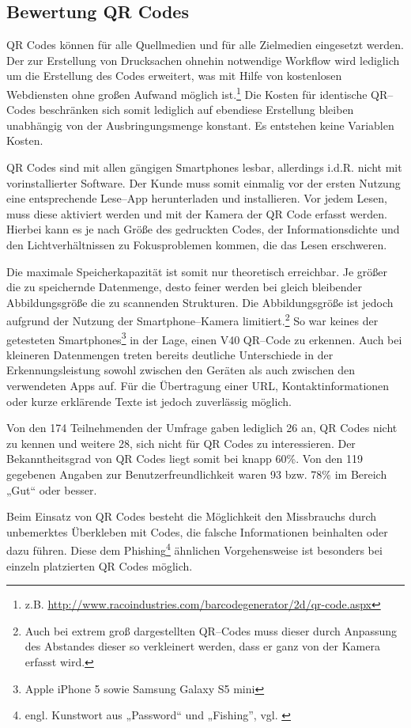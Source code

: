 \subsection{Bewertung QR Codes} %
\label{sub:bewertung_qr_codes}
QR Codes können für alle Quellmedien und für alle Zielmedien eingesetzt werden. Der zur Erstellung von Drucksachen ohnehin notwendige Workflow wird lediglich um die Erstellung des Codes erweitert, was mit Hilfe von kostenlosen Webdiensten ohne großen Aufwand möglich ist.\footnote{z.B. \url{http://www.racoindustries.com/barcodegenerator/2d/qr-code.aspx}} Die Kosten für identische QR–Codes beschränken sich somit lediglich auf ebendiese Erstellung bleiben unabhängig von der Ausbringungsmenge konstant. Es entstehen keine Variablen Kosten.

QR Codes sind mit allen gängigen Smartphones lesbar, allerdings i.d.R. nicht mit vorinstallierter Software. Der Kunde muss somit einmalig vor der ersten Nutzung eine entsprechende Lese–App herunterladen und installieren. Vor jedem Lesen, muss diese aktiviert werden und mit der Kamera der QR Code erfasst werden. Hierbei kann es je nach Größe des gedruckten Codes, der Informationsdichte und den Lichtverhältnissen zu Fokusproblemen kommen, die das Lesen erschweren.   

Die maximale Speicherkapazität ist somit nur theoretisch erreichbar. Je größer die zu speichernde Datenmenge, desto feiner werden bei gleich bleibender Abbildungsgröße die zu scannenden Strukturen. Die Abbildungsgröße ist jedoch aufgrund der Nutzung der Smartphone–Kamera limitiert.\footnote{Auch bei extrem groß dargestellten QR–Codes muss dieser durch Anpassung des Abstandes dieser so verkleinert werden, dass er ganz von der Kamera erfasst wird.} So war keines der getesteten Smartphones\footnote{Apple iPhone 5 sowie Samsung Galaxy S5 mini} in der Lage, einen V40 QR–Code zu erkennen. Auch bei kleineren Datenmengen treten bereits deutliche Unterschiede in der Erkennungsleistung sowohl zwischen den Geräten als auch zwischen den verwendeten Apps auf. Für die Übertragung einer \ac{URL}, Kontaktinformationen oder kurze erklärende Texte ist jedoch zuverlässig möglich.

Von den 174 Teilnehmenden der Umfrage gaben lediglich 26 an, QR Codes nicht zu kennen und weitere 28, sich nicht für QR Codes zu interessieren. Der Bekanntheitsgrad von QR Codes liegt somit bei knapp 60\%. Von den 119 gegebenen Angaben zur Benutzerfreundlichkeit waren 93 bzw. 78\% im Bereich „Gut“ oder besser. 

Beim Einsatz von QR Codes besteht die Möglichkeit den Missbrauchs durch unbemerktes Überkleben mit Codes, die falsche Informationen beinhalten oder dazu führen. Diese dem Phishing\footnote{engl. Kunstwort aus „Password“ und „Fishing”, vgl. \cite{bsi:phishing}} ähnlichen Vorgehensweise ist besonders bei einzeln platzierten QR Codes möglich. 


